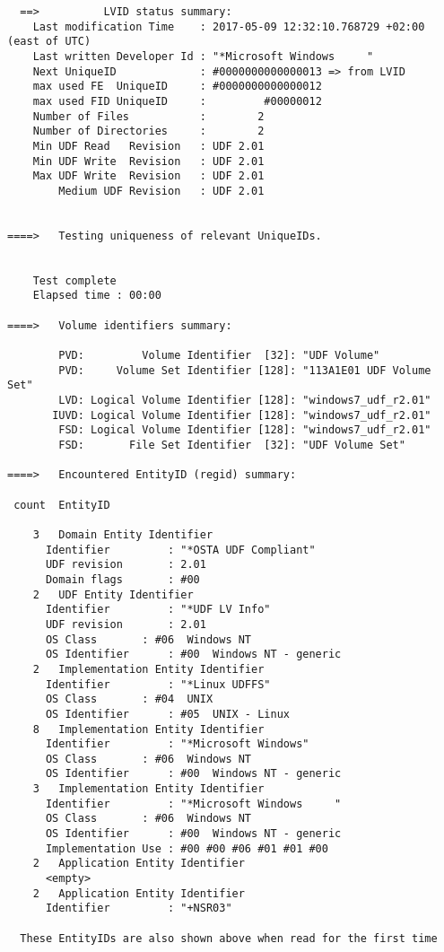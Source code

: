 \begin{lstlisting}
  ==>          LVID status summary:
    Last modification Time    : 2017-05-09 12:32:10.768729 +02:00 (east of UTC)
    Last written Developer Id : "*Microsoft Windows     "
    Next UniqueID             : #0000000000000013 => from LVID
    max used FE  UniqueID     : #0000000000000012
    max used FID UniqueID     :         #00000012
    Number of Files           :        2
    Number of Directories     :        2
    Min UDF Read   Revision   : UDF 2.01
    Min UDF Write  Revision   : UDF 2.01
    Max UDF Write  Revision   : UDF 2.01
        Medium UDF Revision   : UDF 2.01


====>   Testing uniqueness of relevant UniqueIDs.


    Test complete
    Elapsed time : 00:00

====>   Volume identifiers summary:

        PVD:         Volume Identifier  [32]: "UDF Volume"
        PVD:     Volume Set Identifier [128]: "113A1E01 UDF Volume Set"
        LVD: Logical Volume Identifier [128]: "windows7_udf_r2.01"
       IUVD: Logical Volume Identifier [128]: "windows7_udf_r2.01"
        FSD: Logical Volume Identifier [128]: "windows7_udf_r2.01"
        FSD:       File Set Identifier  [32]: "UDF Volume Set"

====>   Encountered EntityID (regid) summary:

 count  EntityID

    3   Domain Entity Identifier
      Identifier         : "*OSTA UDF Compliant"
      UDF revision       : 2.01
      Domain flags       : #00
    2   UDF Entity Identifier
      Identifier         : "*UDF LV Info"
      UDF revision       : 2.01
      OS Class       : #06  Windows NT
      OS Identifier      : #00  Windows NT - generic
    2   Implementation Entity Identifier
      Identifier         : "*Linux UDFFS"
      OS Class       : #04  UNIX
      OS Identifier      : #05  UNIX - Linux
    8   Implementation Entity Identifier
      Identifier         : "*Microsoft Windows"
      OS Class       : #06  Windows NT
      OS Identifier      : #00  Windows NT - generic
    3   Implementation Entity Identifier
      Identifier         : "*Microsoft Windows     "
      OS Class       : #06  Windows NT
      OS Identifier      : #00  Windows NT - generic
      Implementation Use : #00 #00 #06 #01 #01 #00
    2   Application Entity Identifier
      <empty>
    2   Application Entity Identifier
      Identifier         : "+NSR03"

  These EntityIDs are also shown above when read for the first time


\end{lstlisting}
